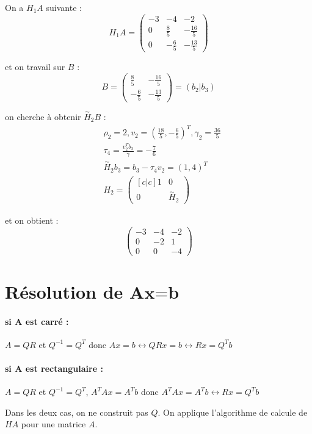 \documentclass[11pt,a4paper]{report}
\begin{document}
On a $H_1A$ suivante :
$$
H_1A = \begin{pmatrix}
-3 & -4 & -2 \\
0 & \frac{8}{5} & -\frac{16}{5} \\
0 & -\frac{6}{5} & -\frac{13}{5}
\end{pmatrix}
$$

et on travail sur $B$ :
$$
B = \begin{pmatrix}
\frac{8}{5} & -\frac{16}{5} \\
-\frac{6}{5} & -\frac{13}{5}
\end{pmatrix} = (b_2|b_3)
$$

on cherche à obtenir $\overset{\sim}{H}_2B$ :
\begin{align*}
& \rho_2 = 2, v_2 = (\frac{18}{5},-\frac{6}{5})^T, \gamma_2=\frac{36}{5} \\
& \tau_4 = \frac{v_2^Tb_3}{\gamma} = -\frac{7}{6}\\
& \overset{\sim}{H}_2b_3 = b_3 - \tau_4v_2 = (1,4)^T \\
& H_2 = 
\begin{pmatrix}[c|c]
1 & 0 \\ \hline
0 & \overset{\sim}{H}_2
\end{pmatrix}
\end{align*}

et on obtient :
$$
\begin{pmatrix}
-3 & -4 & -2 \\
0 & -2 & 1 \\
0 & 0 & -4
\end{pmatrix}
$$

\section{Résolution de $\textbf{Ax=b}$}

\paragraph*{si \textbf{A} est carré : } $A=QR$ et $Q^{-1}=Q^T$ donc $Ax=b \leftrightarrow QRx = b \leftrightarrow Rx = Q^Tb$
\paragraph*{si \textbf{A} est rectangulaire : } $A=QR$ et $Q^{-1}=Q^T$, $A^TAx=A^Tb$ donc $A^TAx=A^Tb\leftrightarrow Rx = Q^Tb$

Dans les deux cas, on ne construit pas $Q$. On applique l'algorithme de calcule de $HA$ pour une matrice $A$.
\end{document}
